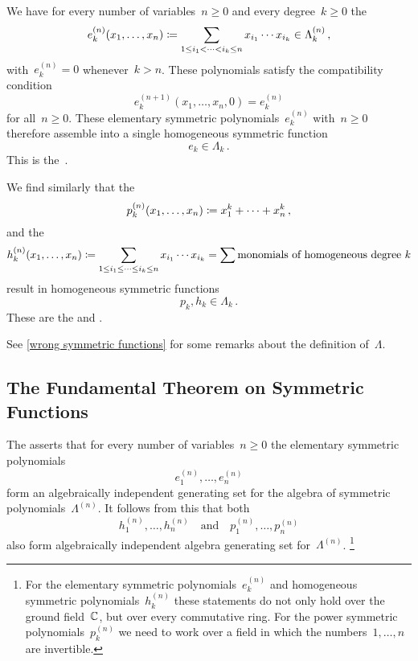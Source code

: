 \documentclass[a4paper,11pt]{scrartcl}
\begin{document}
\begin{example}
  We have for every number of variables~$n \geq 0$ and every degree~$k \geq 0$ the 
  \[
    e^{(n)}_k(x_1, \dotsc, x_n)
    \coloneqq
    \sum_{1 \leq i_1 < \dotsb < i_k \leq n}
    x_{i_1} \dotsm x_{i_k}
    \in
    \Lambda^{(n)}_k \,,
  \]
  with~$e^{(n)}_k = 0$ whenever~$k > n$.
  These polynomials satisfy the compatibility condition
  \[
    e^{(n+1)}_k(x_1, \dotsc, x_n, 0)
    =
    e^{(n)}_k
  \]
  for all~$n \geq 0$.
  These elementary symmetric polynomials~$e^{(n)}_k$ with~$n \geq 0$ therefore assemble into a single homogeneous symmetric function
  \[
    e_k \in \Lambda_k \,.
  \]
  This is the~. 

  We find similarly that the 
  \[
    p^{(n)}_k(x_1, \dotsc, x_n)
    \coloneqq
    x_1^k + \dotsb + x_n^k \,,
  \]
  and the 
  \[
    h^{(n)}_k(x_1, \dotsc, x_n)
    \coloneqq
    \sum_{1 \leq i_1 \leq \dotsb \leq i_k \leq n}
    x_{i_1} \dotsm x_{i_k}
    =
    \sum \text{monomials of homogeneous degree~$k$}
  \]
  result in homogeneous symmetric functions
  \[
    p_k, h_k
    \in
    \Lambda_k \,.
  \]
  These are the  and .
\end{example}

See \cref{wrong symmetric functions} for some remarks about the definition of~$\Lambda$.



\subsection{The Fundamental Theorem on Symmetric Functions}

The  asserts that for every number of variables~$n \geq 0$ the elementary symmetric polynomials
\[
  e^{(n)}_1, \dotsc, e^{(n)}_n
\]
form an algebraically independent generating set for the algebra of symmetric polynomials~$\Lambda^{(n)}$.
It follows from this that both
\[
  h^{(n)}_1, \dotsc, h^{(n)}_n
  \quad\text{and}\quad
  p^{(n)}_1, \dotsc, p^{(n)}_n
\]
also form algebraically independent algebra generating set for~$\Lambda^{(n)}$.%
\footnote{
  For the elementary symmetric polynomials~$e^{(n)}_k$ and homogeneous symmetric polynomials~$h^{(n)}_k$ these statements do not only hold over the ground field~$\mathbb{C}$, but over every commutative ring.
  For the power symmetric polynomials~$p^{(n)}_k$ we need to work over a field in which the numbers~$1, \dotsc, n$ are invertible.
}
\end{document}
